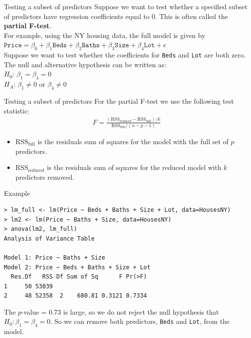 \documentclass[10pt]{beamer}\usepackage[]{graphicx}\usepackage[]{color}
\newcommand{\RSS}{\text{RSS}}
\newcommand{\reduced}{\text{reduced}}
\newcommand{\full}{\text{full}}
\begin{document}
\begin{frame}{Testing a subset of predictors}
Suppose we want to test whether a specified subset of predictors have regression coefficients equal to 0.  This is often called the \textbf{partial F-test}.\\
\vspace{10pt}
For example, using the NY housing data, the full model is given by\\
$\texttt{Price} = \beta_0 + \beta_1 \texttt{Beds} + \beta_2 \texttt{Baths} + \beta_3 \texttt{Size} + \beta_4 \texttt{Lot} + e$\\
\vspace{10pt}
Suppose we want to test whether the coefficients for \texttt{Beds} and \texttt{Lot} are both zero.  The null and alternative hypothesis can be written as:\\
$H_0$: $\beta_1 = \beta_4 = 0$\\
$H_A$: $\beta_1 \neq 0$ or $\beta_4 \neq 0$
\end{frame}

\begin{frame}{Testing a subset of predictors}
For the partial F-test we use the following test statistic:\\

\begin{align*}
F = \frac{(\RSS_{\reduced} - \RSS_{\full}) / k}{\RSS_{\full} / (n-p-1)}
\end{align*}

\begin{itemize}
\item $\RSS_{\full}$ is the residuals sum of squares for the model with the full set of $p$ predictors.
\item $\RSS_{\reduced}$ is the residuals sum of squares for the reduced model with $k$ predictors removed.
\end{itemize}
\end{frame}

\begin{frame}[fragile]{Example}
\small
\begin{verbatim}
> lm_full <- lm(Price ~ Beds + Baths + Size + Lot, data=HousesNY)
> lm2 <- lm(Price ~ Baths + Size, data=HousesNY)
> anova(lm2, lm_full)
Analysis of Variance Table

Model 1: Price ~ Baths + Size
Model 2: Price ~ Beds + Baths + Size + Lot
  Res.Df   RSS Df Sum of Sq      F Pr(>F)
1     50 53039                           
2     48 52358  2    680.81 0.3121 0.7334
\end{verbatim}
\normalsize
The $p$-value = 0.73 is large, so we do not reject the null hypothesis that $H_0: \beta_1 = \beta_4 = 0$.  So we can remove both predictors, \texttt{Beds} and \texttt{Lot}, from the model. 
\end{frame}
\end{document}

